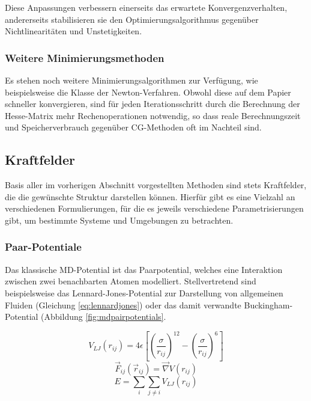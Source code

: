 Diese Anpassungen verbessern einerseits das erwartete Konvergenzverhalten, andererseits stabilisieren sie den Optimierungsalgorithmus gegenüber Nichtlinearitäten und Unstetigkeiten.

\subsubsection{Weitere Minimierungsmethoden}

Es stehen noch weitere Minimierungsalgorithmen zur Verfügung, wie beispielsweise die Klasse der Newton-Verfahren.
Obwohl diese auf dem Papier schneller konvergieren, sind für jeden Iterationsschritt durch die Berechnung der Hesse-Matrix mehr Rechenoperationen notwendig, so dass reale Berechnungszeit und Speicherverbrauch gegenüber CG-Methoden oft im Nachteil sind.

\subsection{Kraftfelder}

Basis aller im vorherigen Abschnitt vorgestellten Methoden sind stets Kraftfelder, die die gewünschte Struktur darstellen können.
Hierfür gibt es eine Vielzahl an verschiedenen Formulierungen, für die es jeweils verschiedene Parametrisierungen gibt, um bestimmte Systeme und Umgebungen zu betrachten.

\subsubsection{Paar-Potentiale}

Das klassische MD-Potential ist das Paarpotential, welches eine Interaktion zwischen zwei benachbarten Atomen modelliert.
Stellvertretend sind beispielsweise das Lennard-Jones-Potential zur Darstellung von allgemeinen Fluiden (Gleichung \ref{eq:lennardjones}) oder das damit verwandte Bucking\-ham-Potential (Abbildung \ref{fig:mdpairpotentials}.

\begin{equation}
  \label{eq:lennardjones}
  V_{LJ}(r_{ij}) = 4 \epsilon \left[\left(\frac{\sigma}{r_{ij}}\right)^{12} - \left(\frac{\sigma}{r_{ij}}\right)^{6}\right]
\end{equation}
\begin{equation}
  \label{eq:pairforce}
  \vec F_{ij}(\vec r_{ij}) = \vec\nabla V(r_{ij})
\end{equation}
\begin{equation}
  \label{eq:pairenergy}
  E = \sum_i\sum_{j \neq i}{V_{LJ}\left(r_{ij}\right)}
\end{equation}

